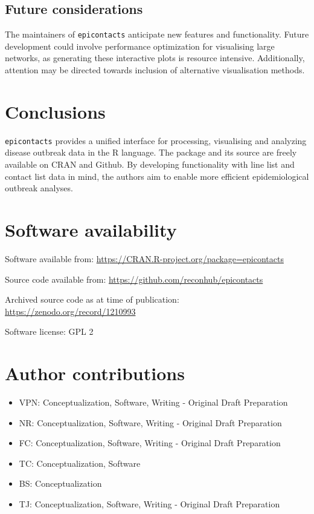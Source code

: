 \documentclass[9pt,a4paper,]{extarticle}
\theoremstyle{definition}
\theoremstyle{definition}
\theoremstyle{definition}
\theoremstyle{remark}
\begin{document}
\subsection{Future considerations}\label{future-considerations}

The maintainers of \texttt{epicontacts} anticipate new features and functionality. Future development could involve performance optimization for visualising large networks, as generating these interactive plots is resource intensive. Additionally, attention may be directed towards inclusion of alternative visualisation methods.

\section{Conclusions}\label{conclusions}

\texttt{epicontacts} provides a unified interface for processing, visualising and analyzing disease outbreak data in the R language. The package and its source are freely available on CRAN and Github. By developing functionality with line list and contact list data in mind, the authors aim to enable more efficient epidemiological outbreak analyses.

\section{Software availability}\label{software-availability}

Software available from: \url{https://CRAN.R-project.org/package=epicontacts}

Source code available from: \url{https://github.com/reconhub/epicontacts}

Archived source code as at time of publication: \url{https://zenodo.org/record/1210993}

Software license: GPL 2

\section{Author contributions}\label{author-contributions}

\begin{itemize}
\item
  VPN: Conceptualization, Software, Writing - Original Draft Preparation
\item
  NR: Conceptualization, Software, Writing - Original Draft Preparation
\item
  FC: Conceptualization, Software, Writing - Original Draft Preparation
\item
  TC: Conceptualization, Software
\item
  BS: Conceptualization
\item
  TJ: Conceptualization, Software, Writing - Original Draft Preparation
\end{itemize}
\end{document}
